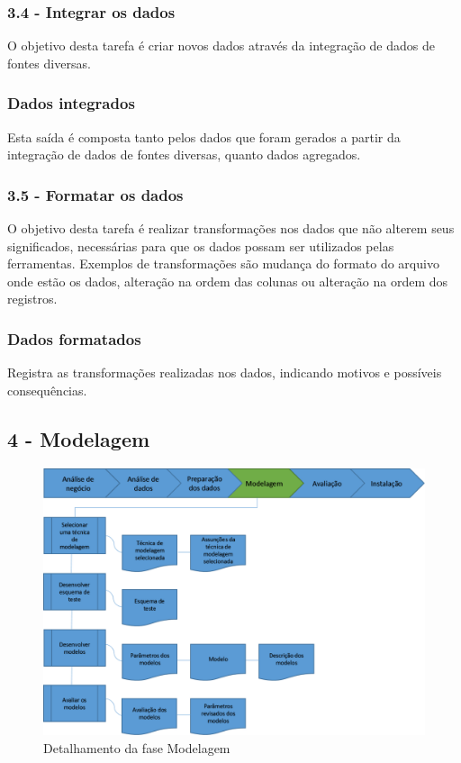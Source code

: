 \subsubsection*{\textbf{3.4 - Integrar os dados}}

O objetivo desta tarefa é criar novos dados através da integração de dados de fontes diversas.

\subsubsection*{Dados integrados}

Esta saída é composta tanto pelos dados que foram gerados a partir da integração de dados de fontes diversas, quanto dados agregados.

\subsubsection*{\textbf{3.5 - Formatar os dados}}

O objetivo desta tarefa é realizar transformações nos dados que não alterem seus significados, necessárias para que os dados possam ser utilizados pelas ferramentas. Exemplos de transformações são mudança do formato do arquivo onde estão os dados, alteração na ordem das colunas ou alteração na ordem dos registros.

\subsubsection*{Dados formatados}

Registra as transformações realizadas nos dados, indicando motivos e possíveis consequências.

\newpage 

\subsection*{4 - Modelagem}


\begin{figure}[H]
	\includegraphics[scale=0.8]{img/CRISP-DM-Modelagem.png}
	\caption{Detalhamento da fase Modelagem}
	\label{img:CRISP-DM-Modelagem}
\end{figure}

